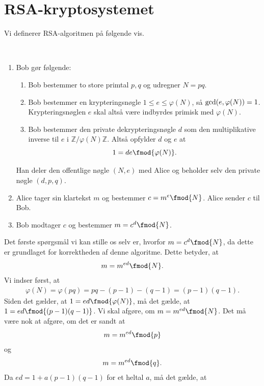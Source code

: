 \section{RSA-kryptosystemet}
Vi definerer RSA-algoritmen på følgende vis. 
\begin{defn}
\phantom{hej}\\
\begin{enumerate}
\item Bob gør følgende:
\begin{enumerate}[label=\roman*)]
\item Bob bestemmer to store primtal $p,q$ og udregner $N = pq$.
\item Bob bestemmer en krypteringsnøgle $1\leq e \leq \varphi(N)$, så $\textnormal{gcd}(e,\varphi(N)) = 1$. Krypteringsnøglen $e$ skal altså være indbyrdes primisk med $\varphi(N)$. 
\item Bob bestemmer den private dekrypteringsnøgle $d$ som den multiplikative inverse til $e$ i $\mathbb{Z}/\varphi(N)\mathbb{Z}$. Altså opfylder $d$ og $e$ at $$1 = de \fmod{\varphi(N)}.$$
\end{enumerate}
Han deler den offentlige nøgle $(N,e)$ med Alice og beholder selv den private nøgle $(d,p,q)$. 

\item Alice tager sin klartekst $m$ og bestemmer $c = m^e \fmod{N}$. Alice sender $c$ til Bob.
\item Bob modtager $c$ og bestemmer $m = c^d \fmod{N}$.  
\end{enumerate}
\end{defn}
Det første spørgsmål vi kan stille os selv er, hvorfor $m = c^d \fmod{N}$, da dette er grundlaget for korrektheden af denne algoritme. Dette betyder, at 
\begin{align*}
m = m^{ed} \fmod{N}.
\end{align*}
Vi indser først, at 
\begin{align*}
\varphi(N) = \varphi(pq) = pq-(p-1) -(q - 1) = (p-1)(q-1).
\end{align*} 
Siden det gælder, at $1 = ed  \fmod{\varphi(N)}$, må det gælde, at $1 = ed \fmod{(p-1)(q-1)}$.
Vi skal afgøre, om $m = m^{ed} \fmod{N}$. Det må være nok at afgøre, om det er sandt at
\begin{align*}
	m = m^{ed} \fmod{p}
\end{align*}
og 
\begin{align*}
	m = m^{ed} \fmod{q}.
\end{align*}
Da $ed = 1 + a(p-1)(q-1)$ for et heltal $a$, må det gælde, at
